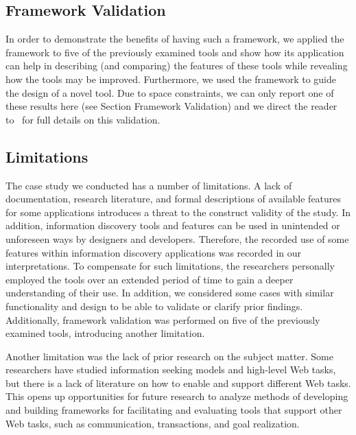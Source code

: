 \documentclass[review]{elsarticle}
\begin{document}
{\subsection{Framework Validation}
\label{subsection:validating}
In order to demonstrate the benefits of having such a framework, we applied the framework to five of the previously examined tools and show how its application can help in describing (and comparing) the features of these tools while revealing how the tools may be improved. Furthermore, we used the framework to guide the design of a novel tool.  Due to space constraints, we can only report one of these results here (see Section Framework Validation) and we direct the reader to~\cite{voyloshnikova2015} for full details on this validation.    

{\subsection{Limitations}
The case study we conducted has a number of limitations. A lack of documentation, research literature, and formal descriptions of available features for some applications introduces a threat to the construct validity of the study. In addition, information discovery tools and features can be used in unintended or unforeseen ways by designers and developers. Therefore, the recorded use of some features within information discovery applications was recorded in our interpretations. To compensate for such limitations, the researchers personally employed the tools over an extended period of time to gain a deeper understanding of their use. In addition, we considered some cases with similar functionality and design to be able to validate or clarify prior findings. 
Additionally, framework validation was performed on five of the previously examined tools, introducing another limitation. 
%

Another limitation was the lack of prior research on the subject matter. Some researchers have studied information seeking models and high-level Web tasks, but there is a lack of literature on how to enable and support different Web tasks. This opens up opportunities for future research to analyze methods of developing and building frameworks for facilitating and evaluating tools that support other Web tasks, such as communication, transactions, and goal realization.
}
}
\end{document}

